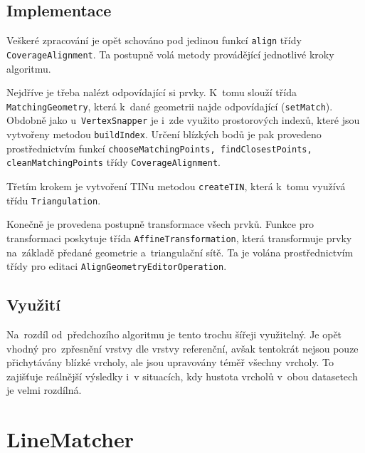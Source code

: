 
\subsection{Implementace} %
\label{ca-implementace}
Veškeré zpracování je opět schováno pod jedinou funkcí \texttt{align} třídy
\texttt{Coverage\-Alignment}. Ta postupně volá metody provádějící jednotlivé
kroky algoritmu.

Nejdříve je třeba nalézt odpovídající si prvky. K~tomu slouží třída 
\texttt{Matching\-Geometry}, která k~dané geometrii najde odpovídající
(\texttt{set\-Match}). Obdobně jako u~\texttt{Vertex\-Snapper} je i~zde 
využito prostorových indexů, které jsou vytvořeny metodou 
\texttt{build\-Index}. Určení blízkých bodů je pak provedeno prostřednictvím
funkcí \texttt{choose\-Matching\-Points, \-find\-Closest\-Points,
\-clean\-Matching\-Points} třídy \texttt{Co\-ve\-ra\-ge\-Align\-ment}.

Třetím krokem je vytvoření TINu metodou \texttt{create\-TIN}, která k~tomu
využívá třídu \texttt{Tri\-an\-gu\-la\-tion}.  

Konečně je provedena postupně transformace všech prvků. Funkce pro
transformaci poskytuje třída \texttt{Affine\-Trans\-for\-mation},
která transformuje prvky na~základě předané geometrie a~triangulační
sítě. Ta je volána prostřednictvím třídy pro editaci 
\texttt{Align\-Geo\-metry\-Edi\-tor\-Ope\-ra\-tion}.


\subsection{Využití}
\label{ca-vyuziti}

Na~rozdíl od~předchozího algoritmu je tento trochu šířeji využitelný. Je opět 
vhodný pro~zpřesnění vrstvy dle vrstvy referenční, avšak tentokrát nejsou 
pouze přichytávány blízké vrcholy, ale jsou upravovány téměř všechny vrcholy. 
To zajišťuje reálnější výsledky i~v situacích, kdy hustota vrcholů v~obou 
datasetech je velmi rozdílná.



\section{LineMatcher}
\label{line matcher}

